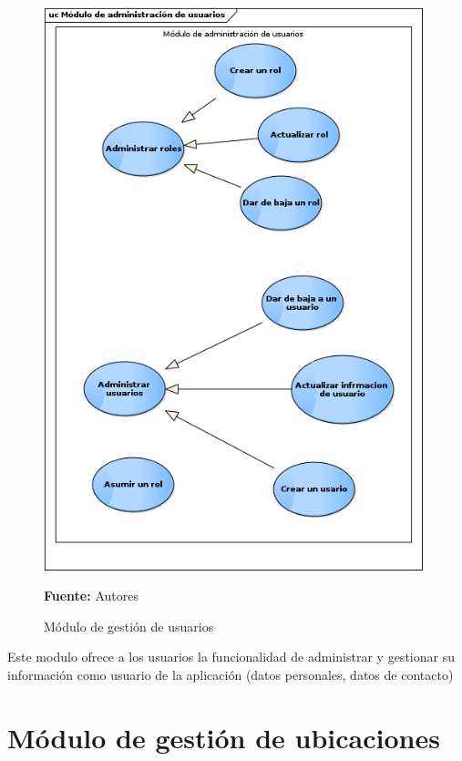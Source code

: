 \begin{figure}[!htb]
  \begin{center}
    \includegraphics[width=11cm]{./imagenes/casos_uso/gestion_usuarios.png}
    \caption{Módulo de gestión de usuarios}
    \label{fig:cu_usuarios}
    \textbf{Fuente:} Autores
  \end{center}
\end{figure}

Este modulo ofrece a los usuarios la funcionalidad de administrar y gestionar su información como usuario de la aplicación (datos personales, datos de contacto)

\section{Módulo de gestión de ubicaciones}

